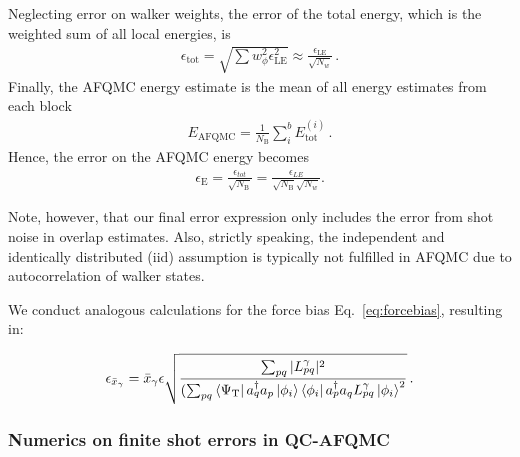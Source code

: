 \documentclass[../main.tex]{subfiles}
\begin{document}
Neglecting error on walker weights, the error of the total energy, which is the weighted sum of all local energies, is
\begin{align}
    \epsilon_{\mathrm{tot}}= \sqrt{\sum w_\phi^2 \epsilon_\mathrm{LE}^2 }\approx \frac{\epsilon_\mathrm{LE}}{\sqrt{N_{w}}}\,.
\end{align}
Finally, the AFQMC energy estimate is the mean of all energy estimates from each block
\begin{align}
    E_\textrm{AFQMC}=\frac{1}{N_\mathrm{B}}\sum_i^b E_\mathrm{tot}^{(i)}\,.
\end{align} Hence, the error on the AFQMC energy becomes
\begin{align}
    \epsilon_\textrm{E}=\frac{\epsilon_{tot}}{\sqrt{N_\mathrm{B}}}=\frac{\epsilon_{LE}}{\sqrt{N_\mathrm{B}}\sqrt{N_{w}}}.
\end{align}

Note, however, that our final error expression only includes the error from shot noise in overlap estimates. Also, strictly speaking, the independent and identically distributed (iid) assumption is typically not fulfilled in AFQMC due to autocorrelation of walker states.

We conduct analogous calculations for the force bias Eq.~\ref{eq:forcebias}, resulting in:

\begin{align}
    \epsilon_{\Bar{x}_\gamma}=\Bar{x}_\gamma \epsilon \sqrt{\frac{\sum_{pq}|L^{\gamma}_{pq}|^2}{(\sum_{pq}\bra{\Psi_\mathrm{T}} a_q^\dagger a_p \ket{\phi_i} \bra{\phi_i} a_p^\dagger a_q  L_{pq}^\gamma \ket{\phi_i}^2}} \, .
\end{align}

\subsubsection{Numerics on finite shot errors in QC-AFQMC}
\end{document}
